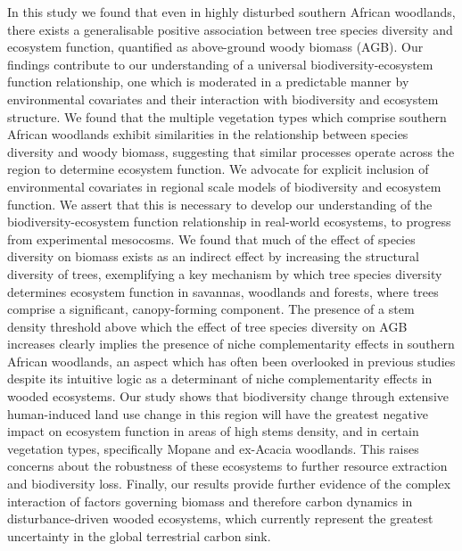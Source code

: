 \begin{refsection}
In this study we found that even in highly disturbed southern African woodlands, there exists a generalisable positive association between tree species diversity and ecosystem function, quantified as above-ground woody biomass (AGB). Our findings contribute to our understanding of a universal biodiversity-ecosystem function relationship, one which is moderated in a predictable manner by environmental covariates and their interaction with biodiversity and ecosystem structure. We found that the multiple vegetation types which comprise southern African woodlands exhibit similarities in the relationship between species diversity and woody biomass, suggesting that similar processes operate across the region to determine ecosystem function. We advocate for explicit inclusion of environmental covariates in regional scale models of biodiversity and ecosystem function. We assert that this is necessary to develop our understanding of the biodiversity-ecosystem function relationship in real-world ecosystems, to progress from experimental mesocosms. We found that much of the effect of species diversity on biomass exists as an indirect effect by increasing the structural diversity of trees, exemplifying a key mechanism by which tree species diversity determines ecosystem function in savannas, woodlands and forests, where trees comprise a significant, canopy-forming component. The presence of a stem density threshold above which the effect of tree species diversity on AGB increases clearly implies the presence of niche complementarity effects in southern African woodlands, an aspect which has often been overlooked in previous studies despite its intuitive logic as a determinant of niche complementarity effects in wooded ecosystems. Our study shows that biodiversity change through extensive human-induced land use change in this region will have the greatest negative impact on ecosystem function in areas of high stems density, and in certain vegetation types, specifically Mopane and ex-Acacia woodlands. This raises concerns about the robustness of these ecosystems to further resource extraction and biodiversity loss. Finally, our results provide further evidence of the complex interaction of factors governing biomass and therefore carbon dynamics in disturbance-driven wooded ecosystems, which currently represent the greatest uncertainty in the global terrestrial carbon sink.

\newpage{}
\FloatBarrier{}
\begingroup
{}
\printbibliography[heading=subbibintoc]
\endgroup
\newpage{}


\end{refsection}
